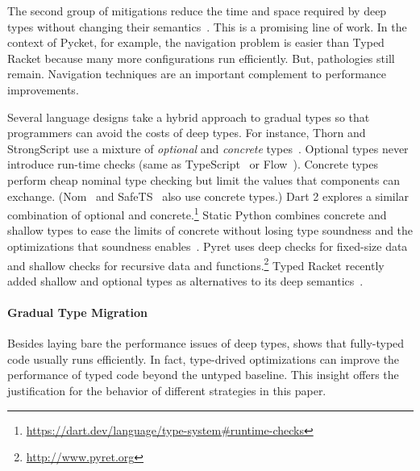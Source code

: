The second group of mitigations reduce the time and space required
by deep types without changing their
semantics~\cite{htf-hosc-2010,stw-jfp-2021,stw-pldi-2015,collapsible,corpse-reviver,
kas-pldi-2019, rat-oopsla-2017,pycket,bbst-oopsla-2017}.
This is a promising line of work.
In the context of Pycket, for example, the navigation problem is easier
than Typed Racket because many more configurations run efficiently.
But, pathologies still remain.
Navigation techniques are an important complement to performance improvements.

Several language designs take a hybrid approach to gradual types
so that programmers can avoid the costs of deep types.
For instance, Thorn and StrongScript use a mixture of
\emph{optional} and \emph{concrete} types~\citep{wzlov-popl-2010,rzv-ecoop-2015}.
Optional types never introduce run-time checks (same as TypeScript~\cite{bat-ecoop-2014} or Flow~\cite{cvgrl-oopsla-2017}).
Concrete types perform cheap nominal type checking but limit the values that components
can exchange.
(Nom~\cite{mt-oopsla-2017,mt-oopsla-2021} and SafeTS~\cite{rsfbv-popl-2015} also use concrete types.)
Dart 2 explores a similar combination of optional and concrete.\footnote{\url{https://dart.dev/language/type-system\#runtime-checks}}
Static Python combines concrete and shallow types to ease the limits
of concrete without losing type soundness and the optimizations that soundness enables~\citep{lgmvpk-pj-2023}.
Pyret uses deep checks for fixed-size data and shallow checks for recursive
data and functions.\footnote{\url{http://www.pyret.org}}
Typed Racket recently added shallow and optional types as alternatives to its deep
semantics~\cite{g-deep-shallow}.

\paragraph{Gradual Type Migration} Besides laying bare the performance issues
of deep types, \citet{gtnffvf-jfp-2019} shows that fully-typed code usually
runs efficiently.
In fact, type-drived optimizations can improve the performance of typed code
beyond the untyped baseline.
This insight offers the justification for the behavior of different
strategies in this paper.

